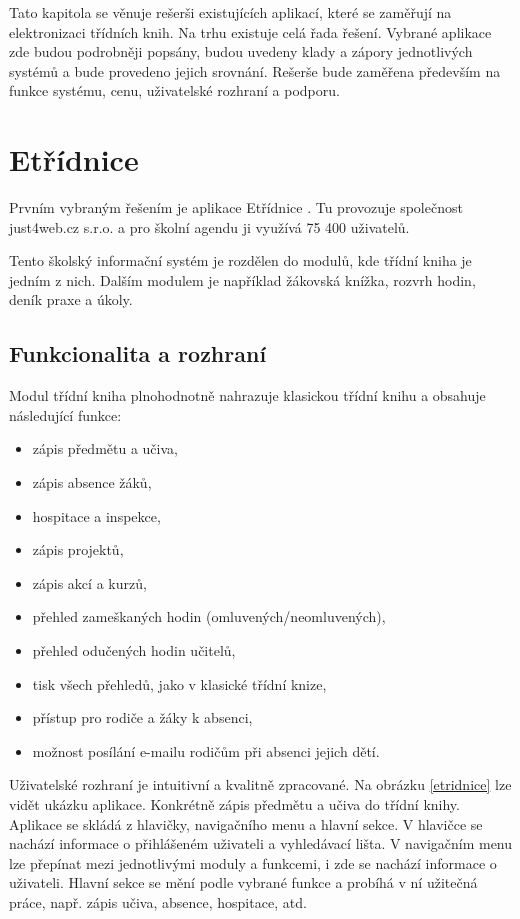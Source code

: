 Tato kapitola se věnuje rešerši existujících aplikací, které se zaměřují na elektronizaci třídních knih. Na trhu existuje celá řada řešení. Vybrané aplikace zde budou podrobněji popsány, budou uvedeny klady a zápory jednotlivých systémů a bude provedeno jejich srovnání. Rešerše  bude zaměřena především na funkce systému, cenu, uživatelské rozhraní a podporu.

\section{Etřídnice}
Prvním vybraným řešením je aplikace Etřídnice \cite{etridnice}. Tu provozuje společnost just4web.cz s.r.o. a pro školní agendu ji využívá 75 400 uživatelů.

Tento školský informační systém je rozdělen do modulů, kde třídní kniha je jedním z nich. Dalším modulem je například žákovská knížka, rozvrh hodin, deník praxe a úkoly.

\subsection{Funkcionalita a rozhraní}
Modul třídní kniha plnohodnotně nahrazuje klasickou třídní knihu a obsahuje následující funkce: 

\begin{itemize}
    \item zápis předmětu a učiva,
    \item zápis absence žáků,
    \item hospitace a inspekce,
    \item zápis projektů,
    \item zápis akcí a kurzů,
    \item přehled zameškaných hodin (omluvených/neomluvených),
    \item přehled odučených hodin učitelů,
    \item tisk všech přehledů, jako v klasické třídní knize,
    \item přístup pro rodiče a žáky k absenci,
    \item možnost posílání e-mailu rodičům při absenci jejich dětí.
\end{itemize}

\noindent Uživatelské rozhraní je intuitivní a kvalitně zpracované. Na obrázku \ref{etridnice} lze vidět ukázku aplikace. Konkrétně zápis předmětu a učiva do třídní knihy. Aplikace se skládá z hlavičky, navigačního menu a hlavní sekce. V hlavičce se nachází informace o přihlášeném uživateli a vyhledávací lišta. V navigačním menu lze přepínat mezi jednotlivými moduly a funkcemi, i zde se nachází informace o uživateli. Hlavní sekce se mění podle vybrané funkce a probíhá v ní užitečná práce, např. zápis učiva, absence, hospitace, atd.

